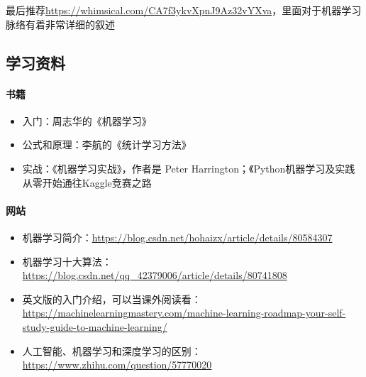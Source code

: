 \documentclass[lang=cn,11pt,a4paper]{eleganttemplate}
\begin{document}
最后推荐\href{https://whimsical.com/CA7f3ykvXpnJ9Az32vYXva}{https://whimsical.com/CA7f3ykvXpnJ9Az32vYXva}，里面对于机器学习脉络有着非常详细的叙述

\subsection{学习资料}
\paragraph{书籍}
\begin{itemize}
    \item 入门：周志华的《机器学习》
    \item 公式和原理：李航的《统计学习方法》
    \item 实战：《机器学习实战》，作者是 Peter Harrington；《Python机器学习及实践 从零开始通往Kaggle竞赛之路
\end{itemize}

\paragraph{网站}
\begin{itemize}
    \item 机器学习简介：\href{https://blog.csdn.net/hohaizx/article/details/80584307}{https://blog.csdn.net/hohaizx/article/details/80584307}
    \item 机器学习十大算法：\href{https://blog.csdn.net/qq_42379006/article/details/80741808}{https://blog.csdn.net/qq\_42379006/article/details/80741808}
    \item 英文版的入门介绍，可以当课外阅读看：\href{https://machinelearningmastery.com/machine-learning-roadmap-your-self-study-guide-to-machine-learning/}{https://machinelearningmastery.com/machine-learning-roadmap-your-self-study-guide-to-machine-learning/}
    \item 人工智能、机器学习和深度学习的区别：\href{https://www.zhihu.com/question/57770020}{https://www.zhihu.com/question/57770020}
\end{itemize}
\end{document}

